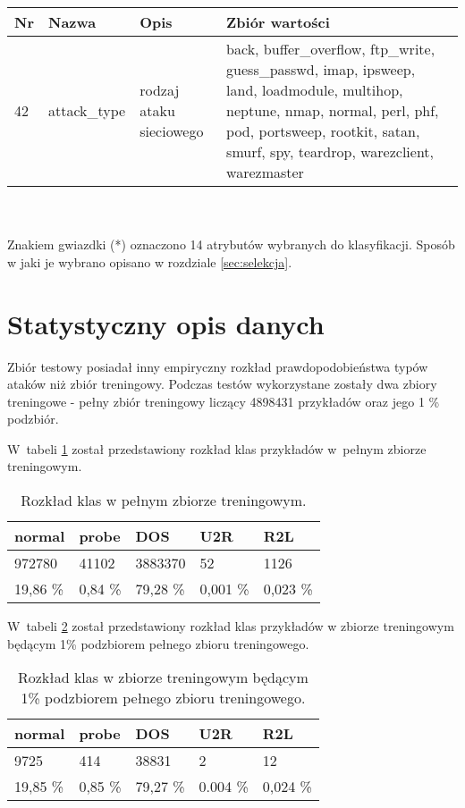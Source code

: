 \documentclass[a4paper, 12pt]{article}
\begin{document}
\begin{tabular}{ | l | l | p{} | p{} | } \hline
Nr & Nazwa & Opis & Zbiór wartości \\ \hline
42      & attack\_type & rodzaj ataku sieciowego & back, buffer\_overflow, ftp\_write, guess\_passwd, imap, ipsweep, land, loadmodule, multihop, neptune, nmap, normal, perl, phf, pod, portsweep, rootkit, satan, smurf, spy, teardrop, warezclient, warezmaster \\ \hline
\end{tabular} \\\\

Znakiem gwiazdki (*) oznaczono 14 atrybutów wybranych do klasyfikacji.
Sposób w jaki je wybrano opisano w rozdziale \ref{sec:selekcja}.

\section{Statystyczny opis danych}

Zbiór testowy posiadał inny empiryczny rozkład prawdopodobieństwa typów ataków niż zbiór treningowy.
Podczas testów wykorzystane zostały dwa zbiory treningowe - pełny zbiór treningowy liczący 4898431 przykładów oraz jego 1 \% podzbiór. 

W~tabeli \ref{table:100percent} został przedstawiony rozkład klas przykładów w~pełnym zbiorze treningowym. 

\begin{table}[htb]
\begin{center}
	\caption{Rozkład klas w pełnym zbiorze treningowym.}
	\label{table:100percent}
	\begin{tabular}{ | l | l | l | l | l | } \hline
		normal & probe & DOS & U2R & R2L \\ \hline
		972780 & 41102 & 3883370 & 52 & 1126 \\ \hline
		19,86 \% & 0,84 \% & 79,28 \% & 0,001 \% & 0,023 \% \\ \hline
	\end{tabular}
\end{center}
\end{table}

W~tabeli \ref{table:1percent} został przedstawiony rozkład klas przykładów w zbiorze treningowym będącym 1\% podzbiorem pełnego zbioru treningowego.
\begin{table}[htb]
\begin{center}
	\caption{Rozkład klas w zbiorze treningowym będącym 1\% podzbiorem pełnego zbioru treningowego.}
	\label{table:1percent}
	\begin{tabular}{ | l | l | l | l | l | } \hline
		normal & probe & DOS & U2R & R2L \\ \hline
		9725 & 414 & 38831 & 2 & 12 \\ \hline
		19,85 \%  & 0,85 \%  & 79,27 \% & 0.004 \%  & 0,024 \% \\ \hline
	\end{tabular}
\end{center}
\end{table}
\end{document}
